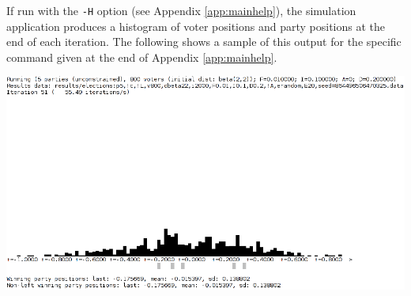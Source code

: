 \documentclass[12pt]{article}
\numberwithin{equation}{subsection}
\begin{document}
If run with the \texttt{-H} option (see Appendix \ref{app:mainhelp}), the simulation application
produces a histogram of voter positions and party positions at the end of each iteration.  The
following shows a sample of this output for the specific command given at the end of
Appendix \ref{app:mainhelp}.

\includegraphics[width=7in]{screenshot.png}


%
%
%

\printbibliography
\end{document}
